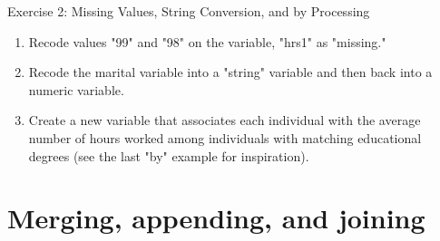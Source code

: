\documentclass[table,smaller]{beamer}
\begin{document}
\begin{frame}[label=sec-5-5]{Exercise 2: Missing Values, String Conversion, and by Processing}
\begin{enumerate}
\item Recode values "99" and "98" on the variable, "hrs1"  as "missing."
\item Recode the marital variable into a "string" variable and then back into a numeric variable.
\item Create a new variable that associates each individual with the average number of hours worked among individuals with matching educational degrees (see the last "by" example for inspiration).
\end{enumerate}
\end{frame}
\section{Merging, appending, and joining}
\label{sec-6}
\end{document}
